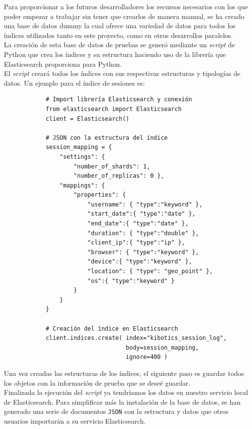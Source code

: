 \documentclass[a4paper, 12pt]{book}
\begin{document}
		Para proporcionar a los futuros desarrolladores los recursos necesarios con los que poder empezar a trabajar sin tener que crearlos de manera manual, se ha creado una base de datos dummy la cual ofrece una variedad de datos para todos los índices utilizados tanto en este proyecto, como en otros desarrollos paralelos.\\

		La creación de esta base de datos de pruebas se generó mediante un \textit{script} de Python que crea los índices y su estructura haciendo uso de la librería que Elasticsearch proporciona para Python.\\
		
		El \textit{script} creará todos los índices con sus respectivas estructuras y tipologías de datos. Un ejemplo para el índice de sesiones es:
		
		{\footnotesize
		\begin{verbatim}
			# Import librería Elasticsearch y conexión
			from elasticsearch import Elasticsearch
			client = Elasticsearch()
			
			# JSON con la estructura del índice
			session_mapping = {
			    "settings": {
			        "number_of_shards": 1,
			        "number_of_replicas": 0 },
			    "mappings": {
			        "properties": {
			            "username": { "type":"keyword" },
			            "start_date":{ "type":"date" },
			            "end_date":{ "type":"date" },
			            "duration": { "type":"double" },
			            "client_ip":{ "type":"ip" },
			            "browser": { "type":"keyword" },
			            "device":{ "type":"keyword" },
			            "location": { "type": "geo_point" },
			            "os":{ "type":"keyword" }
			        }
			    }
			}
			
			# Creación del índice en Elasticsearch
			client.indices.create( index="kibotics_session_log",
			                       body=session_mapping,
			                       ignore=400 )
		\end{verbatim}
		}
	
		Una vez creadas las estructuras de los índices, el siguiente paso es guardar todos los objetos con la información de prueba que se deseé guardar.\\
		
		Finalizada la ejecución del \textit{script} ya tendríamos los datos en nuestro servicio local de Elasticsearch. Para simplificar más la instalación de la base de datos, se han generado una serie de documentos \texttt{JSON} con la estructura y datos que otros usuarios importarán a su servicio Elasticsearch.\\
		
\end{document}
